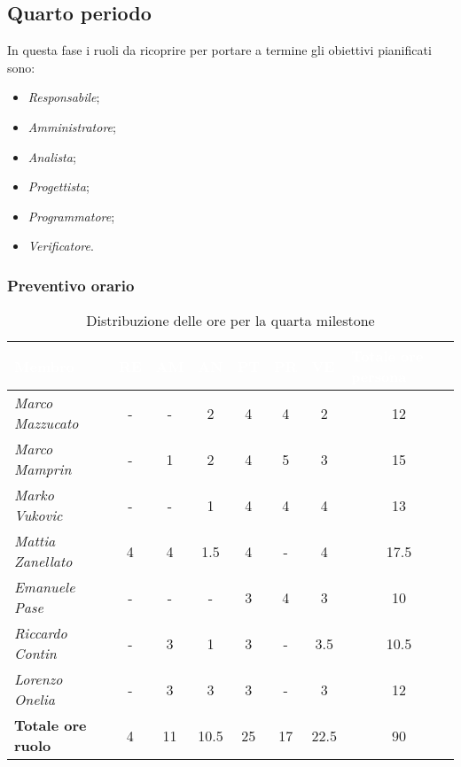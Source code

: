 \newpage
\subsection{Quarto periodo}

In questa fase i ruoli da ricoprire per portare a termine gli obiettivi pianificati sono:
\begin{itemize}
    \item \textit{Responsabile};
    \item \textit{Amministratore};
    \item \textit{Analista};
    \item \textit{Progettista};
    \item \textit{Programmatore};
    \item \textit{Verificatore}.
\end{itemize}

\subsubsection{Preventivo orario}

\begin{table}[H]
    \renewcommand\arraystretch{1.5}
    \centering
    \begin{tabular}{|l|c|c|c|c|c|c|c|}
    \hline
    \rowcolor[HTML]{036400}
    \textcolor{white}{\textbf{Membro}} & \multicolumn{1}{l|}{\textcolor{white}{\textbf{RE}}} & \multicolumn{1}{l|}{\textcolor{white}{\textbf{AM}}} & \multicolumn{1}{l|}{\textcolor{white}{\textbf{AN}}} & \multicolumn{1}{l|}{\textcolor{white}{\textbf{PT}}} & \multicolumn{1}{l|}{\textcolor{white}{\textbf{PR}}} & \multicolumn{1}{l|}{\textcolor{white}{\textbf{VE}}} & \multicolumn{1}{l|}{\textcolor{white}{\textbf{Totale ore persona}}} \\ \hline
    \rowcolor[HTML]{EFEFEF}\textit{Marco Mazzucato}  & - & -   & 2     & 4  & 4   & 2    & 12     \\ \hline
    \rowcolor[HTML]{C0C0C0}\textit{Marco Mamprin}    & - & 1   & 2     & 4  & 5   & 3    & 15     \\ \hline
    \rowcolor[HTML]{EFEFEF}\textit{Marko Vukovic}    & - & -   & 1     & 4  & 4   & 4    & 13     \\ \hline
    \rowcolor[HTML]{C0C0C0}\textit{Mattia Zanellato} & 4 & 4   & 1.5   & 4  & -   & 4    & 17.5   \\ \hline
    \rowcolor[HTML]{EFEFEF}\textit{Emanuele Pase}    & - & -   & -     & 3  & 4   & 3    & 10     \\ \hline
    \rowcolor[HTML]{C0C0C0}\textit{Riccardo Contin}  & - & 3   & 1     & 3  & -   & 3.5  & 10.5   \\ \hline
    \rowcolor[HTML]{EFEFEF}\textit{Lorenzo Onelia}   & - & 3   & 3     & 3  & -   & 3    & 12     \\ \hline
    \rowcolor[HTML]{C0C0C0}\textbf{Totale ore ruolo} & 4 & 11  & 10.5  & 25 & 17  & 22.5 & 90     \\ \hline
    \end{tabular}
    \caption{Distribuzione delle ore per la quarta milestone}
\end{table}

